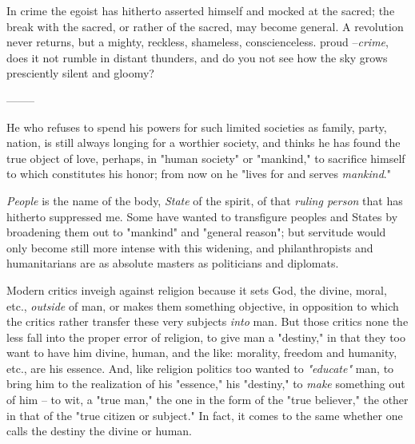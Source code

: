 \documentclass[a4paper]{book}
\begin{document}
In crime the egoist has hitherto asserted himself and mocked at the sacred; 
the break with the sacred, or rather of the sacred, may become general. A 
revolution never returns, but a mighty, reckless, shameless, conscienceless. 
proud --\textit{crime}, does it not rumble in distant thunders, and do you not 
see how the sky grows presciently silent and gloomy?

\begin{center}
--------\end{center}


He who refuses to spend his powers for such limited societies as family, 
party, nation, is still always longing for a worthier society, and thinks he 
has found the true object of love, perhaps, in "{}human society"{} or 
"{}mankind,"{} to sacrifice himself to which constitutes his honor; from now 
on he "{}lives for and serves \textit{mankind}."{}

\textit{People} is the name of the body, \textit{State} of the spirit, of that 
\textit{ruling person} that has hitherto suppressed me. Some have wanted to 
transfigure peoples and States by broadening them out to "{}mankind"{} and 
"{}general reason"{}; but servitude would only become still more intense with 
this widening, and philanthropists and humanitarians are as absolute masters 
as politicians and diplomats.

Modern critics inveigh against religion because it sets God, the divine, 
moral, etc., \textit{outside} of man, or makes them something objective, in 
opposition to which the critics rather transfer these very subjects 
\textit{into} man. But those critics none the less fall into the proper error 
of religion, to give man a "{}destiny,"{} in that they too want to have him 
divine, human, and the like: morality, freedom and humanity, etc., are his 
essence. And, like religion politics too wanted to \textit{"{}educate"{}} man, 
to bring him to the realization of his "{}essence,"{} his "{}destiny,"{} to 
\textit{make} something out of him -- to wit, a "{}true man,"{} the one in the 
form of the "{}true believer,"{} the other in that of the "{}true citizen or 
subject."{} In fact, it comes to the same whether one calls the destiny the 
divine or human.
\end{document}
